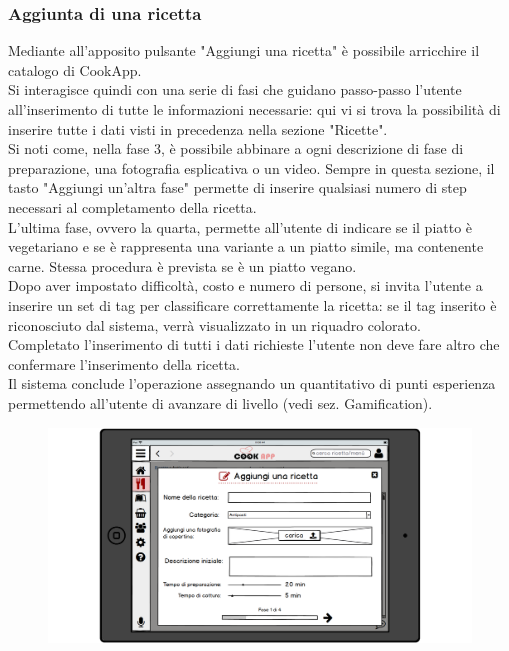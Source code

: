 \subsubsection{Aggiunta di una ricetta}
Mediante all'apposito pulsante "Aggiungi una ricetta" è possibile arricchire il catalogo di CookApp.\\
Si interagisce quindi con una serie di fasi che guidano passo-passo l'utente all'inserimento di tutte le informazioni necessarie: qui vi si trova la possibilità di inserire tutte i dati visti in precedenza nella sezione "Ricette".\\
Si noti come, nella fase 3, è possibile abbinare a ogni descrizione di fase di preparazione, una fotografia esplicativa o un video. Sempre in questa sezione, il tasto "Aggiungi un'altra fase" permette di inserire qualsiasi numero di step necessari al completamento della ricetta.\\
L'ultima fase, ovvero la quarta, permette all'utente di indicare se il piatto è vegetariano e se è rappresenta una variante a un piatto simile, ma contenente carne. Stessa procedura è prevista se è un piatto vegano.\\
Dopo aver impostato difficoltà, costo e numero di persone, si invita l'utente a inserire un set di tag per classificare correttamente la ricetta: se il tag inserito è riconosciuto dal sistema, verrà visualizzato in un riquadro colorato.\\
Completato l'inserimento di tutti i dati richieste l'utente non deve fare altro che confermare l'inserimento della ricetta.\\
Il sistema conclude l'operazione assegnando un quantitativo di punti esperienza permettendo all'utente di avanzare di livello (vedi sez. Gamification).\\
\begin{figure}[H]
	\centering
	\includegraphics[width=0.95\linewidth]{img/mockup/Aggiungi-ricetta1.png}
\end{figure}
